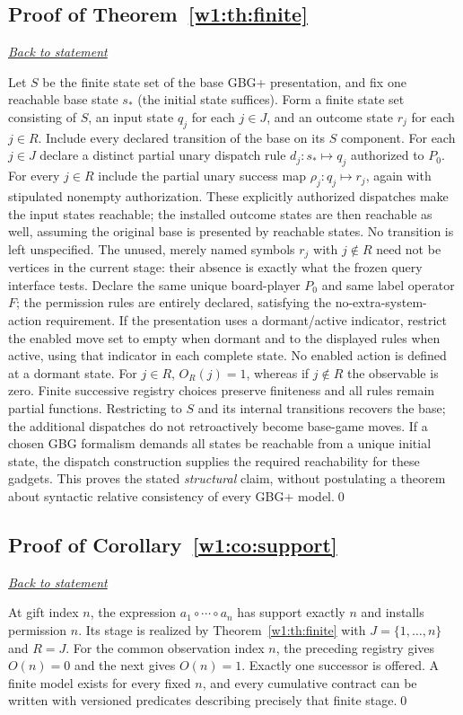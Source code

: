 \documentclass[11pt,letterpaper]{article}
\theoremstyle{definition}\newtheorem{definition}[theorem]{Definition}\newtheorem{example}[theorem]{Example}
\theoremstyle{remark}\newtheorem{remark}[theorem]{Remark}
\newcommand{\backlink}[1]{\noindent\hyperref[#1]{\textit{Back to statement}}\par\smallskip}
\begin{document}
\subsection{Proof of Theorem~\ref{w1:th:finite}}\label{w1:pr:finite}\backlink{w1:th:finite}
Let $S$ be the finite state set of the base GBG+ presentation, and fix one reachable base state $s_*$ (the initial state suffices). Form a finite state set consisting of $S$, an input state $q_j$ for each $j\in J$, and an outcome state $r_j$ for each $j\in R$. Include every declared transition of the base on its $S$ component. For each $j\in J$ declare a distinct partial unary dispatch rule $d_j:s_*\mapsto q_j$ authorized to $P_0$. For every $j\in R$ include the partial unary success map $\rho_j:q_j\mapsto r_j$, again with stipulated nonempty authorization. These explicitly authorized dispatches make the input states reachable; the installed outcome states are then reachable as well, assuming the original base is presented by reachable states. No transition is left unspecified. The unused, merely named symbols $r_j$ with $j\notin R$ need not be vertices in the current stage: their absence is exactly what the frozen query interface tests. Declare the same unique board-player $P_0$ and same label operator $F$; the permission rules are entirely declared, satisfying the no-extra-system-action requirement. If the presentation uses a dormant/active indicator, restrict the enabled move set to empty when dormant and to the displayed rules when active, using that indicator in each complete state. No enabled action is defined at a dormant state. For $j\in R$, $O_R(j)=1$, whereas if $j\notin R$ the observable is zero. Finite successive registry choices preserve finiteness and all rules remain partial functions. Restricting to $S$ and its internal transitions recovers the base; the additional dispatches do not retroactively become base-game moves. If a chosen GBG formalism demands all states be reachable from a unique initial state, the dispatch construction supplies the required reachability for these gadgets. This proves the stated \emph{structural} claim, without postulating a theorem about syntactic relative consistency of every GBG+ model.\qed


\subsection{Proof of Corollary~\ref{w1:co:support}}\label{w1:pr:support}\backlink{w1:co:support}
At gift index $n$, the expression $a_1\circ\cdots\circ a_n$ has support exactly $n$ and installs permission $n$. Its stage is realized by Theorem~\ref{w1:th:finite} with $J=\{1,\dots,n\}$ and $R=J$. For the common observation index $n$, the preceding registry gives $O(n)=0$ and the next gives $O(n)=1$. Exactly one successor is offered. A finite model exists for every fixed $n$, and every cumulative contract can be written with versioned predicates describing precisely that finite stage.\qed
\end{document}

